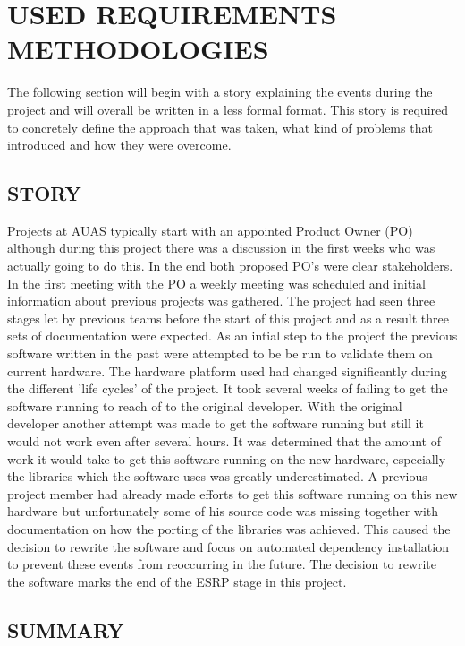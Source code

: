 \documentclass[conference]{IEEEtran}
\begin{document}
\section{USED REQUIREMENTS METHODOLOGIES}

The following section will begin with a story explaining the events during the project and will overall be written in a less formal format. This story is required to concretely define the approach that was taken, what kind of problems that introduced and how they were overcome.

\subsection{STORY}

Projects at AUAS typically start with an appointed Product Owner (PO) although during this project there was a discussion in the first weeks who was actually going to do this. In the end both proposed PO's were clear stakeholders. In the first meeting with the PO a weekly meeting was scheduled and initial information about previous projects was gathered. The project had seen three stages let by previous teams before the start of this project and as a result three sets of documentation were expected. As an intial step to the project the previous software written in the past were attempted to be be run to validate them on current hardware. The hardware platform used had changed significantly during the different 'life cycles' of the project. It took several weeks of failing to get the software running to reach of to the original developer. With the original developer another attempt was made to get the software running but still it would not work even after several hours. It was determined that the amount of work it would take to get this software running on the new hardware, especially the libraries which the software uses was greatly underestimated. A previous project member had already made efforts to get this software running on this new hardware but unfortunately some of his source code was missing together with documentation on how the porting of the libraries was achieved. This caused the decision to rewrite the software and focus on automated dependency installation to prevent these events from reoccurring in the future. The decision to rewrite the software marks the end of the ESRP stage in this project.

\subsection{SUMMARY}
\end{document}

